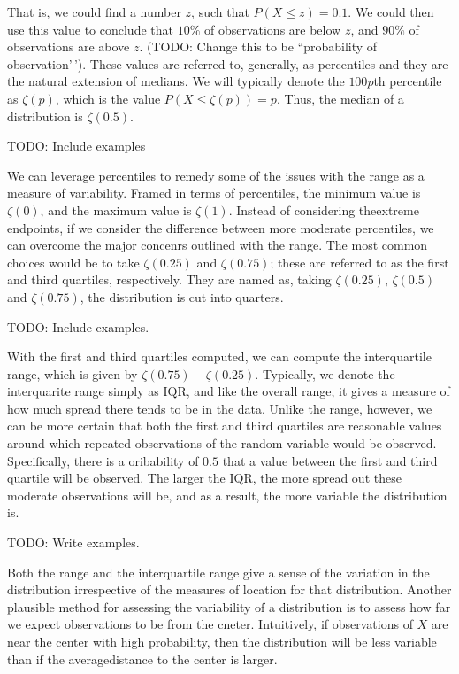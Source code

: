 \documentclass[
  letterpaper,
  DIV=11,
  numbers=noendperiod]{scrreprt}
\begin{document}
That is, we could find a number \(z\), such that \(P(X \leq z) = 0.1\).
We could then use this value to conclude that \(10\%\) of observations
are below \(z\), and \(90\%\) of observations are above \(z\). (TODO:
Change this to be ``probability of observation'\,'). These values are
referred to, generally, as percentiles and they are the natural
extension of medians. We will typically denote the \(100p\)th percentile
as \(\zeta(p)\), which is the value \(P(X \leq \zeta(p)) = p\). Thus,
the median of a distribution is \(\zeta(0.5)\).

TODO: Include examples

We can leverage percentiles to remedy some of the issues with the range
as a measure of variability. Framed in terms of percentiles, the minimum
value is \(\zeta(0)\), and the maximum value is \(\zeta(1)\). Instead of
considering theextreme endpoints, if we consider the difference between
more moderate percentiles, we can overcome the major concenrs outlined
with the range. The most common choices would be to take \(\zeta(0.25)\)
and \(\zeta(0.75)\); these are referred to as the first and third
quartiles, respectively. They are named as, taking \(\zeta(0.25)\),
\(\zeta(0.5)\) and \(\zeta(0.75)\), the distribution is cut into
quarters.

TODO: Include examples.

With the first and third quartiles computed, we can compute the
interquartile range, which is given by \(\zeta(0.75)-\zeta(0.25)\).
Typically, we denote the interquarite range simply as \(\text{IQR}\),
and like the overall range, it gives a measure of how much spread there
tends to be in the data. Unlike the range, however, we can be more
certain that both the first and third quartiles are reasonable values
around which repeated observations of the random variable would be
observed. Specifically, there is a oribability of \(0.5\) that a value
between the first and third quartile will be observed. The larger the
\(\text{IQR}\), the more spread out these moderate observations will be,
and as a result, the more variable the distribution is.

TODO: Write examples.

Both the range and the interquartile range give a sense of the variation
in the distribution irrespective of the measures of location for that
distribution. Another plausible method for assessing the variability of
a distribution is to assess how far we expect observations to be from
the cneter. Intuitively, if observations of \(X\) are near the center
with high probability, then the distribution will be less variable than
if the averagedistance to the center is larger.
\end{document}
